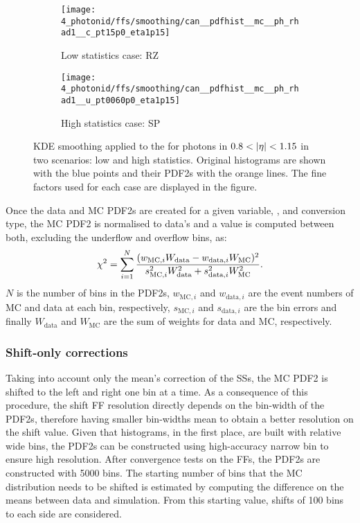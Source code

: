 \begin{figure}[ht!]
    \centering
    \begin{subfigure}[h]{0.49\linewidth}
        \centering
        \texttt{[image: 4\_photonid/ffs/smoothing/can\_\_pdfhist\_\_mc\_\_ph\_rhad1\_\_c\_pt15p0\_eta1p15]}
        \caption{Low statistics case: \ac{RZ}}
    \end{subfigure}
    \hfill
    \begin{subfigure}[h]{0.49\linewidth}
        \centering
        \texttt{[image: 4\_photonid/ffs/smoothing/can\_\_pdfhist\_\_mc\_\_ph\_rhad1\_\_u\_pt0060p0\_eta1p15]}
        \caption{High statistics case: \ac{SP}}
    \end{subfigure}
    \caption{\ac{KDE} smoothing applied to the \rhad for photons in \(0.8<\abseta<1.15\) in two scenarios: low and high statistics. Original histograms are shown with the blue points and their \acp{PDF2} with the orange lines. The fine factors used for each case are displayed in the figure.}
    \label{fig:ss_corrections:ffs:calculation:smoothing_ss}
\end{figure}


Once the data and \ac{MC} \acp{PDF2} are created for a given variable, \pt, \abseta and conversion type, the \ac{MC} \ac{PDF2} is normalised to data's and a \chisq value is computed between both, excluding the underflow and overflow bins, as:
\begin{equation}
	\chi^{2} = \sum_{i=1}^{N} \dfrac{(w_{\text{MC},i} W_{\text{data}} - w_{\text{data},i} W_{\text{MC}})^2}{s_{\text{MC},i}^2 W_{\text{data}}^2 + s_{\text{data},i}^2 W_{\text{MC}}^2}.
\end{equation}
\(N\) is the number of bins in the \acp{PDF2}, \(w_{\text{MC},i}\) and \(w_{\text{data},i}\) are the event numbers of \ac{MC} and data at each bin, respectively, \(s_{\text{MC},i}\) and \(s_{\text{data},i}\) are the bin errors and finally \(W_{\text{data}}\) and \(W_{\text{MC}}\) are the sum of weights for data and \ac{MC}, respectively.

\subsubsection{Shift-only corrections}

Taking into account only the mean's correction of the \acp{SS}, the \ac{MC} \ac{PDF2} is shifted to the left and right one bin at a time. As a consequence of this procedure, the shift \ac{FF} resolution directly depends on the bin-width of the \acp{PDF2}, therefore having smaller bin-widths mean to obtain a better resolution on the shift value. Given that histograms, in the first place, are built with relative wide bins, the \acp{PDF2} can be constructed using high-accuracy narrow bin to ensure high resolution. After convergence tests on the \acp{FF}, the \acp{PDF2} are constructed with 5000 bins.
The starting number of bins that the \ac{MC} distribution needs to be shifted is estimated by computing the difference on the means between data and simulation. From this starting value, shifts of 100 bins to each side are considered.

